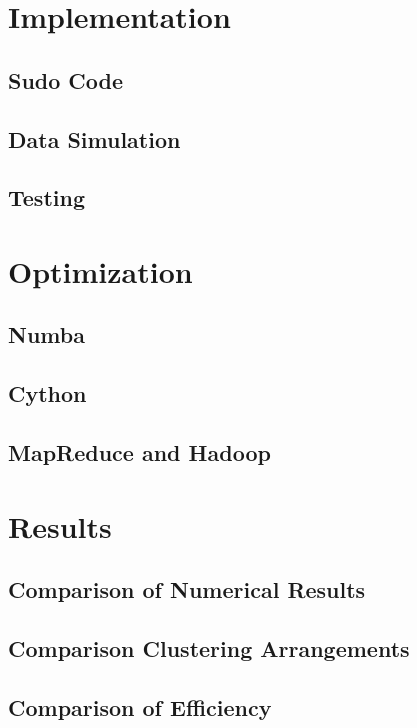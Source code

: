 \documentclass{article} %
\begin{document}
\section{Implementation}
\label{headings}

\subsection{Sudo Code}

\subsection{Data Simulation}

\subsection{Testing}

\section{Optimization}
\label{headings}

\subsection{Numba}

\subsection{Cython}

\subsection{MapReduce and Hadoop}

\section{Results}
\label{headings}

\subsection{Comparison of Numerical Results}

\subsection{Comparison Clustering Arrangements}

\subsection{Comparison of Efficiency}
\end{document}
